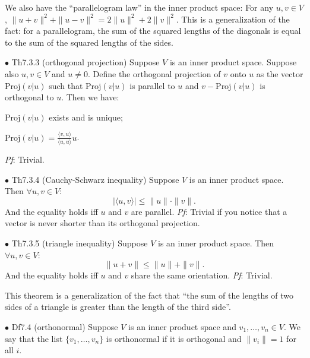 \documentclass{article}
\begin{document}
\begin{Rmk}{}
    We also have the ``parallelogram law'' in the inner product space: \textcolor{Th}{For any $u, v\in V$, $\|u+v\|^2 + \|u-v\|^2 = 2\|u\|^2 + 2\|v\|^2$.} This is a generalization of the fact: for a parallelogram, the sum of the squared lengths of the diagonals is equal to the sum of the squared lengths of the sides.
\end{Rmk}

\begin{Th}{$\bullet$ Th7.3.3 (orthogonal projection)}
    Suppose $V$ is an inner product space. Suppose also $u, v\in V$ and $u\neq 0$. \textcolor{Df}{Define the orthogonal projection of $v$ onto $u$ as the vector $\text{Proj}(v|u)$ such that $\text{Proj}(v|u)$ is parallel to $u$ and $v-\text{Proj}(v|u)$ is orthogonal to $u$.} Then we have:
    \begin{compactenum}
        \item $\text{Proj}(v|u)$ exists and is unique;
        \item $\text{Proj}(v|u) = \frac{\langle v, u\rangle}{\langle u, u\rangle}u$.
    \end{compactenum}
    \tcblower
    \textit{Pf}: Trivial.
\end{Th}

\begin{Th}{$\bullet$ Th7.3.4 (Cauchy-Schwarz inequality)}
    Suppose $V$ is an inner product space. Then $\forall u, v\in V$: 
    $$|\langle u, v\rangle | \leq \|u\|\cdot \|v\|.$$
    And the equality holds iff $u$ and $v$ are parallel.
    \tcblower
    \textit{Pf}: Trivial if you notice that a vector is never shorter than its orthogonal projection.
\end{Th}

\begin{Th}{$\bullet$ Th7.3.5 (triangle inequality)}
    Suppose $V$ is an inner product space. Then $\forall u, v\in V$:
    $$\|u+v\|\leq \|u\| + \|v\|.$$
    And the equality holds iff $u$ and $v$ share the same orientation.
    \tcblower
    \textit{Pf}: Trivial.
\end{Th}

\begin{Rmk}{}
    This theorem is a generalization of the fact that ``the sum of the lengths of two sides of a triangle is greater than the length of the third side''.
\end{Rmk}

\begin{Df}{$\bullet$ Df7.4 (orthonormal)}
    Suppose $V$ is an inner product space and $v_1, \dots, v_n\in V$. We say that the list $\{v_1, \dots, v_n\}$ is orthonormal if it is orthogonal and $\|v_i\| = 1$ for all $i$.
\end{Df}
\end{document}
